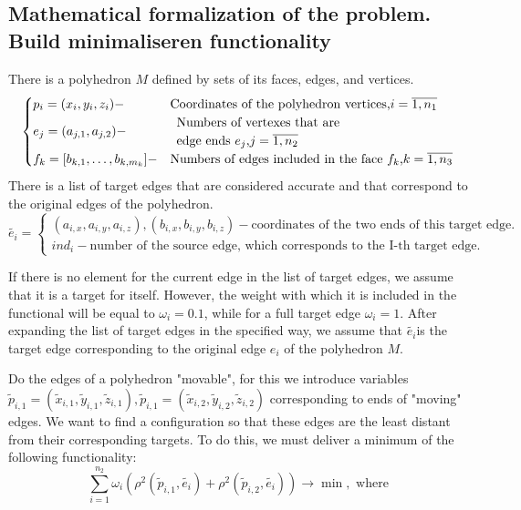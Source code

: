 \documentclass[11pt,fleqn,a4paper]{scrartcl}
\begin{document}
\subsection{Mathematical formalization of the problem. Build minimaliseren functionality}
There is a polyhedron $M$ defined by sets of its faces, edges, and vertices.
$$
\begin{cases}
p_{i}=(x_{i},y_{i},z_{i})- &\text{Coordinates of the polyhedron vertices,} i=\overline{1,n_{1}} \\
e_{j}=(a_{j, 1}, a_{j, 2}) - & \begin{array}[c]{ll}%
\text{Numbers of vertexes that are}
\\
\text{edge ends } e_{j} \text {,} j=\overline{1,n_{2}}
\end{array}\\
f_{k}=[b_{k,1}, \ldots, b_{k,m_{k}}] - & \text{Numbers of edges included in the face } f_{k} \text {,} k=\overline{1,n_{3}} \\
\end{cases}
$$
There is a list of target edges that are considered accurate and that correspond to the original edges of the polyhedron.
$$
\widetilde{e_{i}}=
\begin{cases}
(a_{i, x},a_{i, y},a_{i, z}), (b_{i, x}, b_{i, y},b_{i,z}) -
\text{coordinates of the two ends of this target edge. } \\
ind_{i}-
\text{number of the source edge,
which corresponds to the I-th target edge. }
\end{cases}
$$
\par
If there is no element for the current edge in the list of target edges, we assume that it is a target for itself. However, the weight with which it is included in the functional will be equal to $\omega_{i}=0.1$, while for a full target edge $\omega_{i}=1$. After expanding the list of target edges in the specified way, we assume that $\widetilde{e_{i}}$is the target edge corresponding to the original edge $e_{i}$ of the polyhedron $M$.\par
Do the edges of a polyhedron "movable", for this we introduce variables $\tilde p_{i,1}=(\tilde x_{i,1},\tilde y_{i,1},\tilde z_{i,1}),\tilde p_{i,1}=(\tilde x_{i,2},\tilde y_{i,2},\tilde z_{i,2}) $ corresponding to ends of "moving" edges. We want to find a configuration so that these edges are the least distant from their corresponding targets. To do this, we must deliver a minimum of the following functionality:
$$\sum_{i=1}^{n_{2}}\omega_{i}(\rho^{2}(\tilde p_{i,1},\widetilde{e_{i}})+\rho^{2}(\tilde p_{i, 2},\widetilde{e_{i}}))\rightarrow \min , \text{ where}$$
\end{document}
